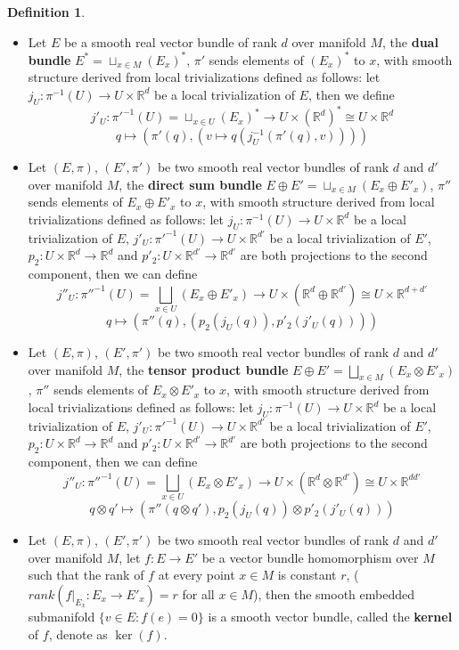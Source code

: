\documentclass{article}
\theoremstyle{definition}
\newtheorem{dfn}[thm]{Definition}
\begin{document}
\begin{dfn}
    \begin{itemize}
        \item Let $E$ be a smooth real vector bundle of rank $d$ over manifold $M$, the {\bf dual bundle} $E^*=\sqcup_{x\in M}(E_x)^*$, $\pi'$ sends elements of $(E_x)^*$ to $x$, with smooth structure derived from local trivializations defined as follows: let $j_U: \pi^{-1}(U)\rightarrow U\times\mathbb{R}^d$ be a local trivialization of $E$, then we define
        \[j'_U: \pi'^{-1}(U)=\sqcup_{x\in U}(E_x)^*\rightarrow U\times (\mathbb{R}^d)^*\cong U\times \mathbb{R}^d\]
        \[q\mapsto (\pi'(q), (v\mapsto q(j_U^{-1}(\pi'(q), v))))\]
        \item Let $(E, \pi)$, $(E', \pi')$ be two smooth real vector bundles of rank $d$ and $d'$ over manifold $M$, the {\bf direct sum bundle} $E\oplus E'=\sqcup_{x\in M}(E_x\oplus E'_x)$, $\pi''$ sends elements of $E_x\oplus E'_x$ to $x$, with smooth structure derived from local trivializations defined as follows: let $j_U: \pi^{-1}(U)\rightarrow U\times\mathbb{R}^d$ be a local trivialization of $E$, $j'_U: \pi'^{-1}(U)\rightarrow U\times\mathbb{R}^{d'}$ be a local trivialization of $E'$, $p_2: U\times\mathbb{R}^d\rightarrow\mathbb{R}^d$ and $p'_2: U\times\mathbb{R}^{d'}\rightarrow\mathbb{R}^{d'}$ are both projections to the second component, then we can define
        \[j''_U: \pi''^{-1}(U)=\bigsqcup_{x\in U}(E_x\oplus E'_x)\rightarrow U\times (\mathbb{R}^d\oplus\mathbb{R}^{d'})\cong U\times \mathbb{R}^{d+d'}\]
        \[q\mapsto (\pi''(q), (p_2(j_U(q)), p'_2(j'_U(q))))\]
        \item Let $(E, \pi)$, $(E', \pi')$ be two smooth real vector bundles of rank $d$ and $d'$ over manifold $M$, the {\bf tensor product bundle} $E\oplus E'=\bigsqcup_{x\in M}(E_x\otimes E'_x)$, $\pi''$ sends elements of $E_x\otimes E'_x$ to $x$, with smooth structure derived from local trivializations defined as follows: let $j_U: \pi^{-1}(U)\rightarrow U\times\mathbb{R}^d$ be a local trivialization of $E$, $j'_U: \pi'^{-1}(U)\rightarrow U\times\mathbb{R}^{d'}$ be a local trivialization of $E'$, $p_2: U\times\mathbb{R}^d\rightarrow\mathbb{R}^d$ and $p'_2: U\times\mathbb{R}^{d'}\rightarrow\mathbb{R}^{d'}$ are both projections to the second component, then we can define
        \[j''_U: \pi''^{-1}(U)=\bigsqcup_{x\in U}(E_x\otimes E'_x)\rightarrow U\times (\mathbb{R}^d\otimes\mathbb{R}^{d'})\cong U\times \mathbb{R}^{dd'}\]
        \[q\otimes q'\mapsto (\pi''(q\otimes q'), p_2(j_U(q))\otimes p'_2(j'_U(q)))\]
        \item Let $(E, \pi)$, $(E', \pi')$ be two smooth real vector bundles of rank $d$ and $d'$ over manifold $M$, let $f: E\rightarrow E'$ be a vector bundle homomorphism over $M$ such that the rank of $f$ at every point $x\in M$ is constant $r$, ($rank(f|_{E_x}: E_x\rightarrow E'_x)=r$ for all $x\in M$), then the smooth embedded submanifold $\{v\in E: f(e)=0\}$ is a smooth vector bundle, called the {\bf kernel} of $f$, denote as $\ker(f)$.
    \end{itemize}
\end{dfn}
\end{document}
